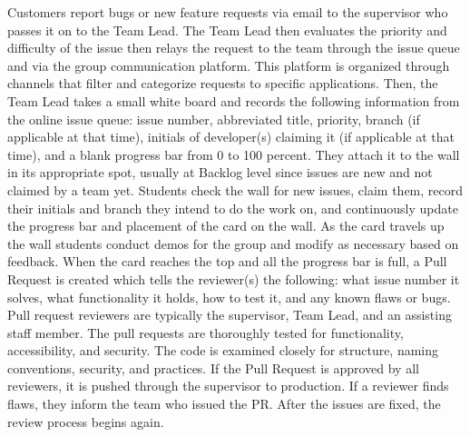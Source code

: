 Customers report bugs or new feature requests via email to the supervisor who passes it on to the Team Lead. The Team Lead then evaluates the priority and difficulty of the issue then relays the request to the team through the issue queue and via the group communication platform. This platform is organized through channels that filter and categorize requests to specific applications.
Then, the Team Lead takes a small white board and records the following information from the online issue queue: issue number, abbreviated title, priority, branch (if applicable at that time), initials of developer(s) claiming it (if applicable at that time), and a blank progress bar from 0 to 100 percent. They attach it to the wall in its appropriate spot, usually at Backlog level since issues are new and not claimed by a team yet. Students check the wall for new issues, claim them, record their initials and branch they intend to do the work on, and continuously update the progress bar and placement of the card on the wall. As the card travels up the wall students conduct demos for the group and modify as necessary based on feedback. When the card reaches the top and all the progress bar is full, a Pull Request is created which tells the reviewer(s) the following: what issue number it solves, what functionality it holds, how to test it, and any known flaws or bugs. Pull request reviewers are typically the supervisor, Team Lead, and an assisting staff member. The pull requests are thoroughly tested for functionality, accessibility, and security. The code is examined closely for structure, naming conventions, security, and practices. If the Pull Request is approved by all reviewers, it is pushed through the supervisor to production. If a reviewer finds flaws, they inform the team who issued the PR. After the issues are fixed, the review process begins again.

